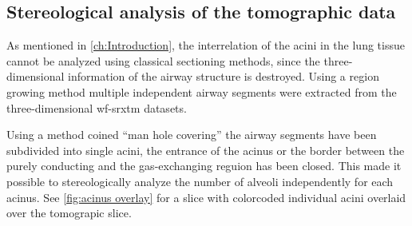 \subsection{Stereological analysis of the tomographic data}
As mentioned in \autoref{ch:Introduction}, the interrelation of the acini in the lung tissue cannot be analyzed using classical sectioning methods, since the three-dimensional information of the airway structure is destroyed. Using a region growing method multiple independent airway segments were extracted from the three-dimensional \ac{wf-srxtm} datasets.

Using a method coined ``man hole covering'' the airway segments have been subdivided into single acini, \ie the entrance of the acinus or the border between the purely conducting and the gas-exchanging reguion has been closed. This made it possible to stereologically analyze the number of alveoli independently for each acinus. See \autoref{fig:acinus overlay} for a slice with colorcoded individual acini overlaid over the tomograpic slice.

